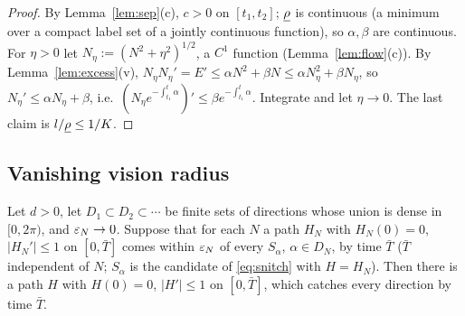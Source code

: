 \begin{proof}
By Lemma~\ref{lem:sep}(c), $c>0$ on $[t_1,t_2]$; $\underline\rho$ is continuous (a minimum over a compact label set of a jointly
continuous function), so $\alpha,\beta$ are continuous. For $\eta>0$ let $N_\eta:=(N^2+\eta^2)^{1/2}$, a
$C^1$ function (Lemma~\ref{lem:flow}(c)). By Lemma~\ref{lem:excess}(v), $N_\eta N_\eta'=E'\le\alpha N^2+\beta N\le\alpha
N_\eta^2+\beta N_\eta$, so $N_\eta'\le\alpha N_\eta+\beta$, i.e.\ $(N_\eta e^{-\int_{t_1}^t\alpha})'\le\beta e^{-\int_{t_1}^t\alpha}$.
Integrate and let $\eta\to0$. The last claim is $l/\underline\rho\le1/K$.
\end{proof}

\subsection{Vanishing vision radius}

\begin{lemma}\label{lem:compact}
Let $d>0$, let $D_1\subset D_2\subset\cdots$ be finite sets of directions whose union is dense in $[0,2\pi)$, and $\varepsilon_N\to0$.
Suppose that for each $N$ a path $H_N$ with $H_N(0)=0$, $|H_N'|\le1$ on $[0,\bar T]$ comes within $\varepsilon_N$ of every $S_\alpha$,
$\alpha\in D_N$, by time $\bar T$ \textup($\bar T$ independent of $N$; $S_\alpha$ is the candidate of \eqref{eq:snitch} with $H=H_N$\textup).
Then there is a path $H$ with $H(0)=0$, $|H'|\le1$ on $[0,\bar T]$, which catches every direction by time $\bar T$.
\end{lemma}

